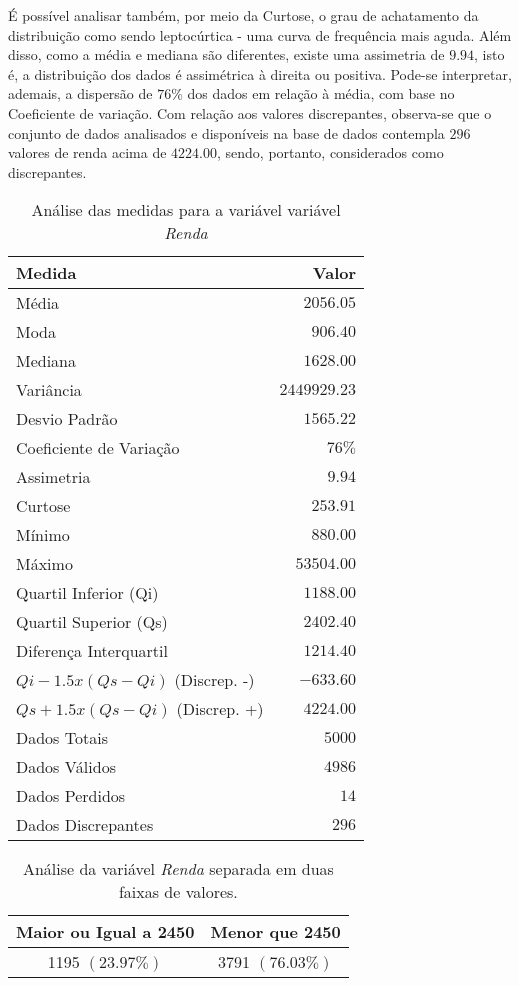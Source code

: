 \documentclass[10pt,a4paper,oneside]{article}
\begin{document}
É possível analisar também, por meio da Curtose, o grau de achatamento da distribuição como sendo leptocúrtica - uma curva de frequência mais aguda. Além disso, como a média e mediana são diferentes, existe uma assimetria de $9.94$, isto é, a distribuição dos dados é assimétrica à direita ou positiva. Pode-se interpretar, ademais, a dispersão de $76\%$ dos dados em relação à média, com base no Coeficiente de variação.
Com relação aos valores discrepantes, observa-se que o conjunto de dados analisados e disponíveis na base de dados contempla $296$ valores de renda acima de $4224.00$, sendo, portanto, considerados como discrepantes.

\begin{table}[!h]
\centering
\caption{Análise das medidas para a variável variável \textit{Renda}}
\vspace{0.5em}
\label{table:medidas-renda}
\begin{tabular}{l r}
	\toprule
	\textbf{Medida} 		& \textbf{Valor} \\
	\midrule
	Média 				&  $2056.05$ \\
	Moda 				&  $906.40$ \\
	Mediana 			&  $1628.00$ \\
	Variância 			&  $2449929.23$ \\
	Desvio Padrão 			&  $1565.22$ \\
	Coeficiente de Variação 	&  $76\%$ \\
	Assimetria 			&  $9.94$ \\
	Curtose 			&  $253.91$ \\
	Mínimo 				&  $880.00$ \\
	Máximo 				&  $53504.00$ \\
	Quartil Inferior (Qi) 		&  $1188.00$ \\
	Quartil Superior (Qs)	 	&  $2402.40$ \\
	Diferença Interquartil 		&  $1214.40$ \\
	$Qi-1.5x(Qs-Qi)$ (Discrep. -)	&  $-633.60$ \\
	$Qs+1.5x(Qs-Qi)$ (Discrep. +)	&  $4224.00$ \\
	Dados Totais 			&  $5000$ \\
	Dados Válidos 			&  $4986$ \\
	Dados Perdidos 			&  $14$ \\
	Dados Discrepantes 		&  $296$ \\
	\bottomrule
\end{tabular}
\end{table}



\begin{table}[!h]
\centering
\caption{Análise da variável \textit{Renda} separada em duas faixas de valores.}
\vspace{0.5em}
\label{table:frequencias-renda}
\begin{tabular}{c c}
	\toprule
	\textbf{Maior ou Igual a 2450} & \textbf{Menor que 2450} \\
	\midrule
	1195 $(23.97\%)$ & 3791 $(76.03\%)$ \\
	\bottomrule
\end{tabular}
\end{table}


%
%
\end{document}
